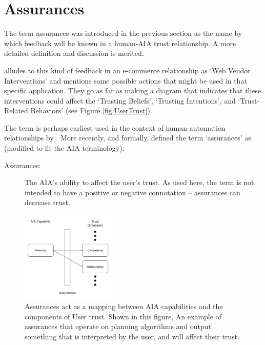 \section{Assurances}
    The term assurances was introduced in the previous section as the name by which feedback will be known in a human-AIA trust relationship. A more detailed definition and discussion is merited.

    \citet{McKnight2001-fa} alludes to this kind of feedback in an e-commerce relationship as `Web Vendor Interventions' and mentions some possible actions that might be used in that specific application. They go as far as making a diagram that indicates that these interventions could affect the `Trusting Beliefs', `Trusting Intentions', and `Trust-Related Behaviors' (see Figure \ref{fig:UserTrust}).
    
    The term is perhaps earliest used in the context of human-automation relationships by \citet{Sheridan1984-kx}. More recently, and formally, \citet{Lillard2016-yg} defined the term `assurances' as (modified to fit the AIA terminology):
    
    \begin{description}
        \item [Assurances:] The AIA's ability to affect the user's trust. As used here, the term is not intended to have a positive or negative connotation -- assurances can decrease trust.
    \end{description}

	\begin{figure}[htbp]
    	\centering
     	\includegraphics[width=0.4\textwidth]{Figures/Assurance_mapping.pdf}
    	\caption{Assurances act as a mapping between AIA capabilities and the components of User trust. Shown in this figure, An example of assurances that operate on planning algorithms and output something that is interpreted by the user, and will affect their trust.}
        \label{fig:assurance_mapping}
    \end{figure}
    
